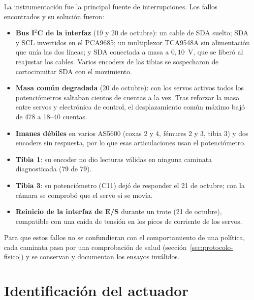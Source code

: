 La instrumentación fue la principal fuente de interrupciones. Los fallos
encontrados y su solución fueron:
\begin{itemize}
    \item \textbf{Bus I$^2$C de la interfaz} (19 y 20 de octubre): un cable de SDA
    suelto; SDA y SCL invertidos en el PCA9685; un multiplexor TCA9548A sin
    alimentación que unía las dos líneas; y SDA conectada a masa a $0{,}10$~V,
    que se liberó al reajustar los cables. Varios encoders de las tibias se
    sospecharon de cortocircuitar SDA con el movimiento.
    \item \textbf{Masa común degradada} (20 de octubre): con los servos activos
    todos los potenciómetros saltaban cientos de cuentas a la vez. Tras reforzar
    la masa entre servos y electrónica de control, el desplazamiento común máximo bajó de 478 a
    18--40 cuentas.
    \item \textbf{Imanes débiles} en varios AS5600 (coxas 2 y 4, fémures 2 y 3,
    tibia 3) y dos encoders sin respuesta, por lo que esas articulaciones usan
    el potenciómetro.
    \item \textbf{Tibia 1}: su encoder no dio lecturas válidas en ninguna caminata
    diagnosticada (79 de 79).
    \item \textbf{Tibia 3}: su potenciómetro (C11) dejó de responder el 21 de
    octubre; con la cámara se comprobó que el servo sí se movía.
    \item \textbf{Reinicio de la interfaz de E/S} durante un trote (21 de octubre), compatible
    con una caída de tensión en los picos de corriente de los servos.
\end{itemize}
Para que estos fallos no se confundieran con el comportamiento de una política,
cada caminata pasa por una comprobación de salud
(sección~\ref{sec:protocolo-fisico}) y se conservan y documentan los ensayos
inválidos.

\section{Identificación del actuador}

